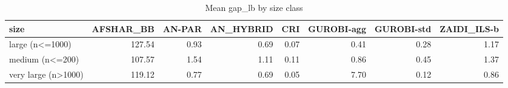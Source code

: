 \begin{table}[htbp]
\centering
\small
\caption{Mean gap\_lb by size class}
\label{tab:E10b_state_of_the_art_60s_b60_by_size}
\begin{tabular}{lrrrrrrr}
\toprule
size & AFSHAR\_BB & AN-PAR & AN\_HYBRID & CRI & GUROBI-agg & GUROBI-std & ZAIDI\_ILS-b \\
\midrule
large (n<=1000) & 127.54 & 0.93 & 0.69 & 0.07 & 0.41 & 0.28 & 1.17 \\
medium (n<=200) & 107.57 & 1.54 & 1.11 & 0.11 & 0.86 & 0.45 & 1.37 \\
very large (n>1000) & 119.12 & 0.77 & 0.69 & 0.05 & 7.70 & 0.12 & 0.86 \\
\bottomrule
\end{tabular}
\end{table}
